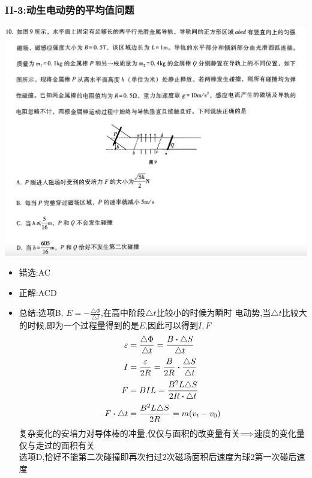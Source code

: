 \documentclass{article}
\begin{document}
\subsubsection{II-3:动生电动势的平均值问题}
\includegraphics[width=50em,keepaspectratio]{./pictures/3.1-3.png}

\begin{itemize}
    \item 错选:\quad AC
    \item 正解:\quad ACD
    \item 总结:\quad 选项B, $E = - \frac{\triangle \Phi}{\triangle t}$,在高中阶段$\triangle t$比较小的时候为瞬时
          电动势,当$\triangle t$比较大的时候,即为一个过程量得到的是$\overline{E}$,因此可以得到$\overline{I},\overline{F}$
          \begin{align*}
              \varepsilon         & = \frac{\triangle \Phi}{\triangle t} = \frac{B \vdot \triangle S}{\triangle t} \\
              I                   & = \frac{\varepsilon}{2R} = \frac{B}{2R} \vdot \frac{\triangle S}{\triangle t}  \\
              F                   & = B I L = \frac{B^{2}L \triangle S}{2R \vdot \triangle t}                      \\
              F \vdot \triangle t & = \frac{B^{2} L \triangle S}{2 R} = m(v_{t} - v_{0})
          \end{align*}
          复杂变化的安培力对导体棒的冲量,仅仅与面积的改变量有关$\Longrightarrow$速度的变化量仅与走过的面积有关 \\
          选项D,恰好不能第二次碰撞即再次扫过2次磁场面积后速度为球2第一次碰后速度
\end{itemize}
\end{document}
